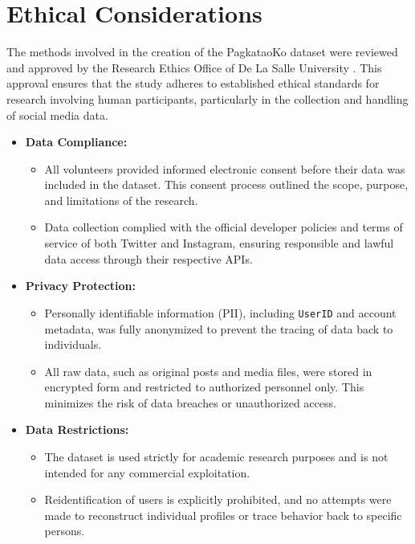 %
%

\section{Ethical Considerations}
\label{sec:Ethics}

The methods involved in the creation of the PagkataoKo dataset were reviewed and approved by the Research Ethics Office of De La Salle University \citep{tighe_acorda_2022}. This approval ensures that the study adheres to established ethical standards for research involving human participants, particularly in the collection and handling of social media data.

\begin{itemize}
	\item \textbf{Data Compliance:}
	\begin{itemize}
		\item All volunteers provided informed electronic consent before their data was included in the dataset. This consent process outlined the scope, purpose, and limitations of the research.
		\item Data collection complied with the official developer policies and terms of service of both Twitter and Instagram, ensuring responsible and lawful data access through their respective APIs.
	\end{itemize}
	
	\item \textbf{Privacy Protection:}
	\begin{itemize}
		\item Personally identifiable information (PII), including \texttt{UserID} and account metadata, was fully anonymized to prevent the tracing of data back to individuals.
		\item All raw data, such as original posts and media files, were stored in encrypted form and restricted to authorized personnel only. This minimizes the risk of data breaches or unauthorized access.
	\end{itemize}
	
	\item \textbf{Data Restrictions:}
	\begin{itemize}
		\item The dataset is used strictly for academic research purposes and is not intended for any commercial exploitation.
		\item Reidentification of users is explicitly prohibited, and no attempts were made to reconstruct individual profiles or trace behavior back to specific persons.
	\end{itemize}
\end{itemize}

